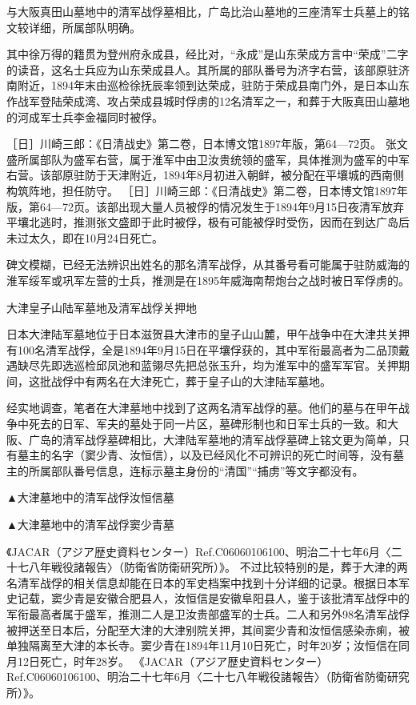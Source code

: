 \documentclass[12pt,UTF8]{ctexbook}
\begin{document}
与大阪真田山墓地中的清军战俘墓相比，广岛比治山墓地的三座清军士兵墓上的铭文较详细，所属部队明确。

其中徐万得的籍贯为登州府永成县，经比对，“永成”是山东荣成方言中“荣成”二字的读音，这名士兵应为山东荣成县人。其所属的部队番号为济字右营，该部原驻济南附近，1894年末由巡检徐抚辰率领到达荣成，驻防于荣成县南门外，是日本山东作战军登陆荣成湾、攻占荣成县城时俘虏的12名清军之一，和葬于大阪真田山墓地的河成军士兵李金福同时被俘。

［日］川崎三郎：《日清战史》第二卷，日本博文馆1897年版，第64—72页。
张文盛所属部队为盛军右营，属于淮军中由卫汝贵统领的盛军，具体推测为盛军的中军右营。该部原驻防于天津附近，1894年8月初进入朝鲜，被分配在平壤城的西南侧构筑阵地，担任防守。 ［日］川崎三郎：《日清战史》第二卷，日本博文馆1897年版，第64—72页。该部出现大量人员被俘的情况发生于1894年9月15日夜清军放弃平壤北逃时，推测张文盛即于此时被俘，极有可能被俘时受伤，因而在到达广岛后未过太久，即在10月24日死亡。

碑文模糊，已经无法辨识出姓名的那名清军战俘，从其番号看可能属于驻防威海的淮军绥军或巩军左营的士兵，推测是在1895年威海南帮炮台之战时被日军俘虏的。

大津皇子山陆军墓地及清军战俘关押地

日本大津陆军墓地位于日本滋贺县大津市的皇子山山麓，甲午战争中在大津共关押有100名清军战俘，全是1894年9月15日在平壤俘获的，其中军衔最高者为二品顶戴遇缺尽先即选巡检邱凤池和蓝翎尽先把总张玉升，均为淮军中的盛军军官。关押期间，这批战俘中有两名在大津死亡，葬于皇子山的大津陆军墓地。

经实地调查，笔者在大津墓地中找到了这两名清军战俘的墓。他们的墓与在甲午战争中死去的日军、军夫的墓处于同一片区，墓碑形制也和日军士兵的一致。和大阪、广岛的清军战俘墓碑相比，大津陆军墓地的清军战俘墓碑上铭文更为简单，只有墓主的名字（窦少青、汝恒信），以及已经风化不可辨识的死亡时间等，没有墓主的所属部队番号信息，连标示墓主身份的“清国”“捕虏”等文字都没有。


▲大津墓地中的清军战俘汝恒信墓


▲大津墓地中的清军战俘窦少青墓

《JACAR（アジア歴史資料センター）Ref.C06060106100、明治二十七年6月〈二十七八年戦役諸報告〉（防衛省防衛研究所）》。
不过比较特别的是，葬于大津的两名清军战俘的相关信息却能在日本的军史档案中找到十分详细的记录。根据日本军史记载，窦少青是安徽合肥县人，汝恒信是安徽阜阳县人，鉴于该批清军战俘中的军衔最高者属于盛军，推测二人是卫汝贵部盛军的士兵。二人和另外98名清军战俘被押送至日本后，分配至大津的大津别院关押，其间窦少青和汝恒信感染赤痢，被单独隔离至大津的本长寺。窦少青在1894年11月10日死亡，时年20岁；汝恒信在同月12日死亡，时年28岁。 《JACAR（アジア歴史資料センター）Ref.C06060106100、明治二十七年6月〈二十七八年戦役諸報告〉（防衛省防衛研究所）》。
\end{document}
